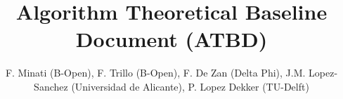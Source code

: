 \documentclass[deltaphi]{deltaphi-report}
\title{Algorithm Theoretical Baseline Document (ATBD)}
\author{F. Minati (B-Open), F. Trillo (B-Open), F. De Zan (Delta Phi), J.M. Lopez-Sanchez (Universidad de Alicante), P. Lopez Dekker (TU-Delft)}
\newcommand{\EnableFootNotes}{%
  \LetLtxMacro\footnote\Oldfootnote%
}
\newcommand{\DisableFootNotes}{%
  \renewcommand{\footnote}[2][]{\relax}
}
\begin{document}
\maketitle
\makelog


%

%
%
%
%
%
%
\end{document}
